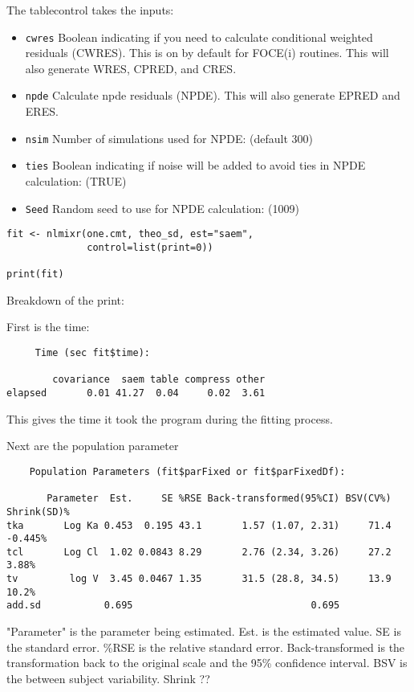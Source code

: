 The tablecontrol takes the inputs: 
\begin{itemize}
  \item \texttt{cwres} \hfill Boolean indicating if you need to calculate conditional weighted residuals (CWRES). This is on by default for FOCE(i) routines. This will also generate WRES, CPRED, and CRES.
  \item \texttt{npde} \hfill Calculate npde residuals (NPDE). This will also generate EPRED and ERES.
  \item \texttt{nsim} \hfill Number of simulations used for NPDE: (default 300)
  \item \texttt{ties} \hfill Boolean indicating if noise will be added to avoid ties in NPDE calculation: (TRUE)
  \item \texttt{Seed} \hfill Random seed to use for NPDE calculation: (1009)
\end{itemize}


\begin{lstlisting}
fit <- nlmixr(one.cmt, theo_sd, est="saem",
              control=list(print=0))

print(fit)
\end{lstlisting}

Breakdown of the print: 

First is the time:
\begin{lstlisting}
     Time (sec fit$time):

        covariance  saem table compress other
elapsed       0.01 41.27  0.04     0.02  3.61
\end{lstlisting}
This gives the time it took the program during the fitting process. 

Next are the population parameter
\begin{lstlisting}
    Population Parameters (fit$parFixed or fit$parFixedDf):

       Parameter  Est.     SE %RSE Back-transformed(95%CI) BSV(CV%) Shrink(SD)%
tka       Log Ka 0.453  0.195 43.1       1.57 (1.07, 2.31)     71.4    -0.445%
tcl       Log Cl  1.02 0.0843 8.29       2.76 (2.34, 3.26)     27.2      3.88%
tv         log V  3.45 0.0467 1.35       31.5 (28.8, 34.5)     13.9      10.2%
add.sd           0.695                               0.695
\end{lstlisting}
"Parameter" is the parameter being estimated. Est. is the estimated value. SE is the standard error. \%RSE is the relative standard error. Back-transformed is the transformation back to the original scale and the 95\% confidence interval. BSV is the between subject variability. Shrink ??


